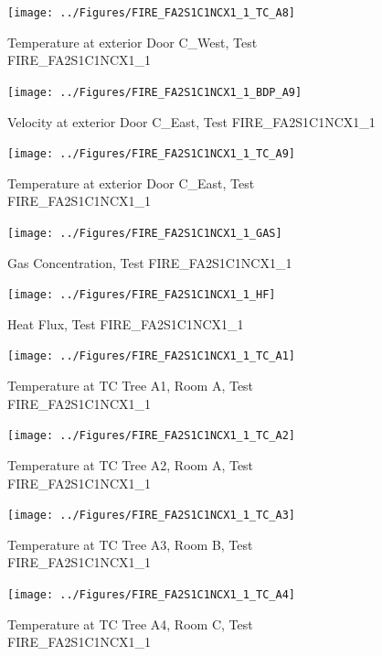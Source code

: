 \documentclass[11pt,oneside]{book}
\begin{document}
\begin{figure}[!ht]
\texttt{[image: ../Figures/FIRE\_FA2S1C1NCX1\_1\_TC\_A8]}
\caption{Temperature at exterior Door C\_West, Test FIRE\_FA2S1C1NCX1\_1}
\label{fig:FIRE_FA2S1C1NCX1_1_TC_A8}
\end{figure}

\begin{figure}[!ht]
\texttt{[image: ../Figures/FIRE\_FA2S1C1NCX1\_1\_BDP\_A9]}
\caption{Velocity at exterior Door C\_East, Test FIRE\_FA2S1C1NCX1\_1}
\label{fig:FIRE_FA2S1C1NCX1_1_BDP_A9}
\end{figure}

\begin{figure}[!ht]
\texttt{[image: ../Figures/FIRE\_FA2S1C1NCX1\_1\_TC\_A9]}
\caption{Temperature at exterior Door C\_East, Test FIRE\_FA2S1C1NCX1\_1}
\label{fig:FIRE_FA2S1C1NCX1_1_TC_A9}
\end{figure}

\begin{figure}[!ht]
\texttt{[image: ../Figures/FIRE\_FA2S1C1NCX1\_1\_GAS]}
\caption{Gas Concentration, Test FIRE\_FA2S1C1NCX1\_1}
\label{fig:FIRE_FA2S1C1NCX1_1_GAS}
\end{figure}

\begin{figure}[!ht]
\texttt{[image: ../Figures/FIRE\_FA2S1C1NCX1\_1\_HF]}
\caption{Heat Flux, Test FIRE\_FA2S1C1NCX1\_1}
\label{fig:FIRE_FA2S1C1NCX1_1_HF}
\end{figure}

\begin{figure}[!ht]
\texttt{[image: ../Figures/FIRE\_FA2S1C1NCX1\_1\_TC\_A1]}
\caption{Temperature at TC Tree A1, Room A, Test FIRE\_FA2S1C1NCX1\_1}
\label{fig:FIRE_FA2S1C1NCX1_1_TC_A1}
\end{figure}

\begin{figure}[!ht]
\texttt{[image: ../Figures/FIRE\_FA2S1C1NCX1\_1\_TC\_A2]}
\caption{Temperature at TC Tree A2, Room A, Test FIRE\_FA2S1C1NCX1\_1}
\label{fig:FIRE_FA2S1C1NCX1_1_TC_A2}
\end{figure}

\begin{figure}[!ht]
\texttt{[image: ../Figures/FIRE\_FA2S1C1NCX1\_1\_TC\_A3]}
\caption{Temperature at TC Tree A3, Room B, Test FIRE\_FA2S1C1NCX1\_1}
\label{fig:FIRE_FA2S1C1NCX1_1_TC_A3}
\end{figure}

\begin{figure}[!ht]
\texttt{[image: ../Figures/FIRE\_FA2S1C1NCX1\_1\_TC\_A4]}
\caption{Temperature at TC Tree A4, Room C, Test FIRE\_FA2S1C1NCX1\_1}
\label{fig:FIRE_FA2S1C1NCX1_1_TC_A4}
\end{figure}
\end{document}
